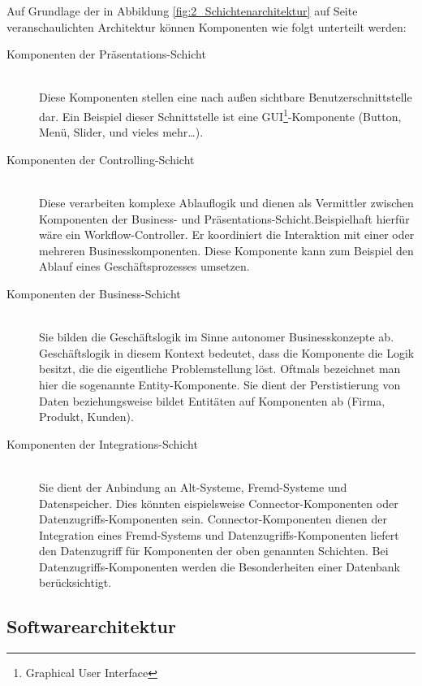 Auf Grundlage der in Abbildung \ref{fig:2_Schichtenarchitektur} auf Seite \pageref{fig:2_Schichtenarchitektur} veranschaulichten Architektur können Komponenten wie folgt unterteilt werden:
\begin{description}
\item[Komponenten der Präsentations-Schicht] \hfill \\
Diese Komponenten stellen eine nach außen sichtbare Benutzerschnittstelle dar. Ein Beispiel dieser Schnittstelle ist eine GUI\footnote{Graphical User Interface}-Komponente (Button, Menü, Slider, und vieles mehr\ldots).
\item[Komponenten der Controlling-Schicht] \hfill \\
Diese verarbeiten komplexe Ablauflogik und dienen als Vermittler zwischen Komponenten der Business- und Präsentations-Schicht.Beispielhaft hierfür wäre ein Workflow-Controller. Er koordiniert die Interaktion mit einer oder mehreren Businesskomponenten. Diese Komponente kann zum Beispiel den Ablauf eines Geschäftsprozesses umsetzen.
\item[Komponenten der Business-Schicht] \hfill \\
Sie bilden die Geschäftslogik im Sinne autonomer Businesskonzepte ab. Geschäftslogik in diesem Kontext bedeutet, dass die Komponente die Logik besitzt, die die eigentliche Problemstellung löst. Oftmals bezeichnet man hier die sogenannte Entity-Komponente. Sie dient der Perstistierung von Daten beziehungsweise bildet Entitäten auf Komponenten ab (Firma, Produkt, Kunden).
\item[Komponenten der Integrations-Schicht] \hfill \\
Sie dient der Anbindung an Alt-Systeme, Fremd-Systeme und Datenspeicher. Dies könnten eispielsweise Connector-Komponenten oder Datenzugriffs-Komponenten sein. Connector-Komponenten dienen der Integration eines Fremd-Systems und Datenzugriffs-Komponenten liefert den Datenzugriff für Komponenten der oben genannten Schichten. Bei Datenzugriffs-Komponenten werden die Besonderheiten einer Datenbank berücksichtigt.
\end{description}

\subsection{Softwarearchitektur}
\label{sec:2_Softwarearchitektur}

